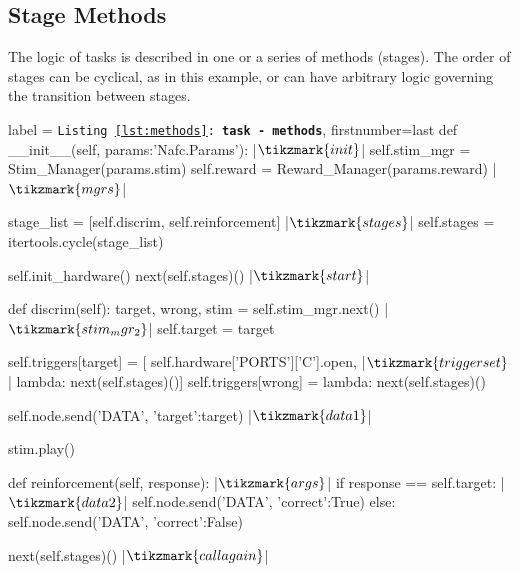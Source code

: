\clearpage

\subsection{Stage Methods}

The logic of tasks is described in one or a series of methods (stages). The order of stages can be cyclical, as in this example, or can have arbitrary logic governing the transition between stages.

\begin{listing}[h!]
\begin{pythoncode*}{label = \texttt{Listing \ref{lst:methods}: \textbf{task - methods}}, firstnumber=last}
    def __init__(self, params:'Nafc.Params'): |$\tikzmark{init}$|
        self.stim_mgr = Stim_Manager(params.stim)
        self.reward   = Reward_Manager(params.reward) |$\tikzmark{mgrs}$|

        stage_list  = [self.discrim, self.reinforcement] |$\tikzmark{stages}$|
        self.stages = itertools.cycle(stage_list)

        self.init_hardware()
        next(self.stages)() |$\tikzmark{start}$|

    def discrim(self):
        target, wrong, stim = self.stim_mgr.next() |$\tikzmark{stim_mgr_2}$|
        self.target = target

        self.triggers[target] = [
            self.hardware['PORTS']['C'].open, |$\tikzmark{triggerset}$|
            lambda: next(self.stages)()]
        self.triggers[wrong] = lambda: next(self.stages)()

        self.node.send('DATA', {'target':target}) |$\tikzmark{data1}$|

        stim.play()

    def reinforcement(self, response): |$\tikzmark{args}$|
        if response == self.target: |$\tikzmark{data2}$|
            self.node.send('DATA', {'correct':True})
        else:
            self.node.send('DATA', {'correct':False})

        next(self.stages)() |$\tikzmark{callagain}$|
\end{pythoncode*}
\captionlistentry{}%
\label{lst:methods}%
\end{listing}%
